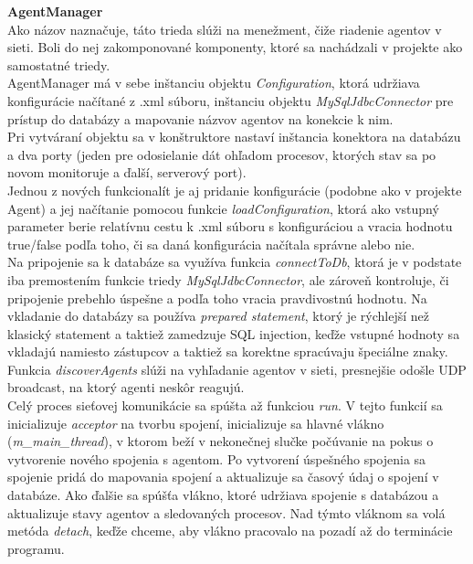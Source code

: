 \documentclass[a4paper,12pt]{article}
\begin{document}
\textbf{AgentManager} \\

Ako názov naznačuje, táto trieda slúži na menežment, čiže riadenie agentov v sieti. Boli do nej zakomponované komponenty, ktoré sa nachádzali v projekte ako samostatné triedy. \\

AgentManager má v sebe inštanciu objektu \textit{Configuration}, ktorá udržiava konfigurácie načítané z .xml súboru, inštanciu objektu \textit{MySqlJdbcConnector} pre prístup do databázy a mapovanie názvov agentov na konekcie k nim. \\

Pri vytváraní objektu sa v konštruktore nastaví inštancia konektora na databázu a dva porty (jeden pre odosielanie dát ohľadom procesov, ktorých stav sa po novom monitoruje a ďalší, serverový port). \\

Jednou z nových funkcionalít je aj pridanie konfigurácie (podobne ako v projekte Agent) a jej načítanie pomocou funkcie \textit{loadConfiguration}, ktorá ako vstupný parameter berie relatívnu cestu k .xml súboru s konfiguráciou a vracia hodnotu true/false podľa toho, či sa daná konfigurácia načítala správne alebo nie. \\

Na pripojenie sa k databáze sa využíva funkcia \textit{connectToDb}, ktorá je v podstate iba premostením funkcie triedy \textit{MySqlJdbcConnector}, ale zároveň kontroluje, či pripojenie prebehlo úspešne a podľa toho vracia pravdivostnú hodnotu. Na vkladanie do databázy sa používa \textit{prepared statement}, ktorý je rýchlejší než klasický statement a taktiež zamedzuje SQL injection, keďže vstupné hodnoty sa vkladajú namiesto zástupcov a taktiež sa korektne spracúvaju špeciálne znaky. \\

Funkcia \textit{discoverAgents} slúži na vyhľadanie agentov v sieti, presnejšie odošle UDP broadcast, na ktorý agenti neskôr reagujú. \\

Celý proces sieťovej komunikácie sa spúšta až funkciou \textit{run}. V tejto funkcií sa inicializuje \textit{acceptor} na tvorbu spojení, inicializuje sa hlavné vlákno (\textit{m\_main\_thread}), v ktorom beží v nekonečnej slučke počúvanie na pokus o vytvorenie nového spojenia s agentom. Po vytvorení úspešného spojenia sa spojenie pridá do mapovania spojení a aktualizuje sa časový údaj o spojení v databáze. Ako ďalšie sa spúšťa vlákno, ktoré udržiava spojenie s databázou a aktualizuje stavy agentov a sledovaných procesov. Nad týmto vláknom sa volá metóda \textit{detach}, keďže chceme, aby vlákno pracovalo na pozadí až do terminácie programu. \\
\end{document}
